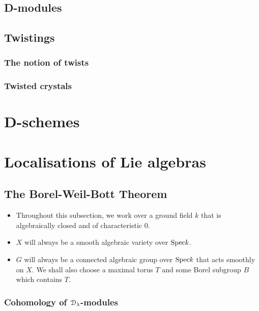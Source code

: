         \subsection{D-modules}
        
        \subsection{Twistings}
            \subsubsection{The notion of twists}
            
            \subsubsection{Twisted crystals}
            
    \section{D-schemes}
    
    \section{Localisations of Lie algebras}
        \subsection{The Borel-Weil-Bott Theorem}
            \begin{convention}
                \noindent
                \begin{itemize}
                    \item Throughout this subsection, we work over a ground field $k$ that is algebraically closed and of characteristic $0$. 
                    \item $X$ will always be a smooth algebraic variety over $\mathrm{Spec} k$.
                    \item $G$ will always be a connected algebraic group over $\mathrm{Spec} k$ that acts smoothly on $X$. We shall also choose a maximal torus $T$ and some Borel subgroup $B$ which contains $T$.
                \end{itemize}
            \end{convention}
            
            \subsubsection{Cohomology of \texorpdfstring{$\mathcal{D}_{\lambda}$}{}-modules}
            
